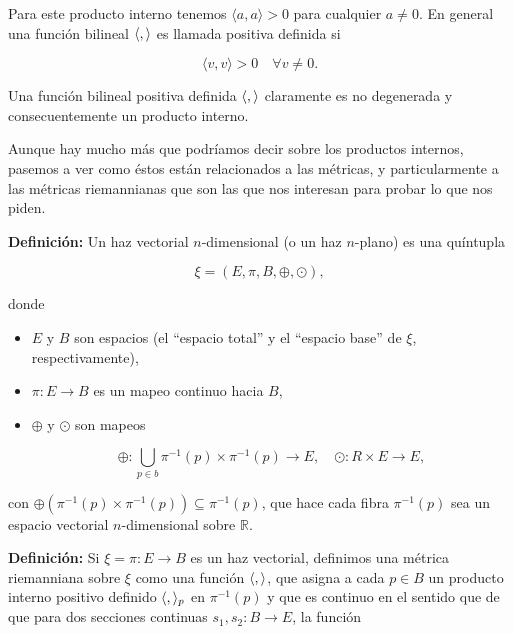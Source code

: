 \documentclass[a4paper,10pt]{article}
\numberwithin{equation}{section}
\newcommand{\definicion}{\textbf{Definición: }}
\begin{document}
Para este producto interno tenemos $\langle a, a \rangle > 0$ para cualquier 
$a \ne 0$. En general una función bilineal $\langle \space, \space \rangle$ es 
llamada positiva definida si 

\begin{equation}
 \langle v, v \rangle > 0 \quad \forall v \ne 0.
\end{equation}

Una función bilineal positiva definida $\langle \space, \space \rangle$
claramente es no degenerada y consecuentemente un producto interno. 

\vspace{.3cm}

Aunque hay mucho más que podríamos decir sobre los productos internos, 
pasemos a ver como éstos están relacionados a las métricas, y particularmente 
a las métricas riemannianas que son las que nos interesan para probar lo que
nos piden. 

\definicion Un haz vectorial $n$-dimensional (o un haz $n$-plano)
es una quíntupla 

\begin{equation}
 \xi = (E,\pi,B,\oplus,\odot),
\end{equation}

donde 

\begin{itemize}
 \item $E$ y $B$ son espacios (el ``espacio total'' y el ``espacio base'' de 
 $\xi$, respectivamente),
 \item $\pi: E \rightarrow B$ es un mapeo continuo hacia $B$,
 \item $\oplus$ y $\odot$ son mapeos
 
 \begin{equation}
  \oplus: \underset{p \in b}{\bigcup} \pi^{-1}(p) \times \pi^{-1}(p) \rightarrow E, \quad 
  \odot: R \times E \rightarrow E,
 \end{equation}
\end{itemize}

con $\oplus(\pi^{-1}(p) \times \pi^{-1}(p)) \subseteq \pi^{-1}(p)$, que hace 
cada fibra $\pi^{-1}(p)$ sea un espacio vectorial $n$-dimensional sobre 
$\mathbb{R}$.

\definicion Si $\xi = \pi: E \rightarrow B$ es un haz vectorial, definimos 
una métrica riemanniana sobre $\xi$ como una función $\langle \space, \space \rangle$, 
que asigna a cada $p \in B$ un producto interno positivo definido $\langle \space, \space \rangle_p$
en $\pi^{-1}(p)$ y que es continuo en el sentido que de que para dos secciones continuas 
$s_1,s_2: B \rightarrow E$, la función
\end{document}
